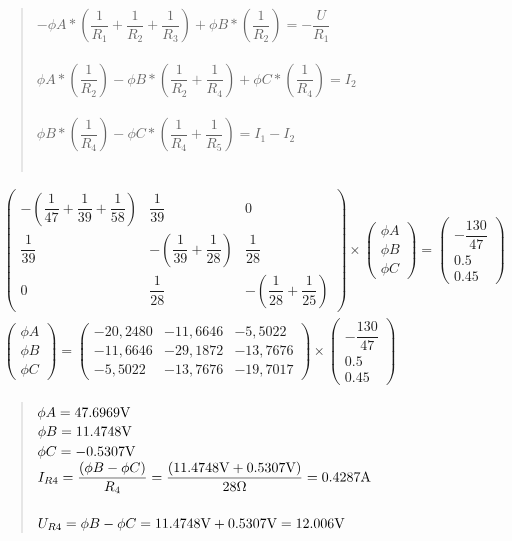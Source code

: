 \begin{quote}
    \medskip
    \medskip
    \centering
    $-\phi A * (\dfrac{1}{R_1} +  \dfrac{1}{R_2} + \dfrac{1}{R_3}) + \phi B * (\dfrac{ 1}{R_2} )  = -\dfrac{U}{R_1}$ \\~\\ 
    $\phi A * (\dfrac{1}{R_2}) - \phi B * (\dfrac{1}{R_2} + \dfrac{1}{R_4} ) + \phi C * (\dfrac{1}{R_4})  = I_2 $ \\~\\
    $\phi B * (\dfrac{1}{R_4}) - \phi C * (\dfrac{1}{R_4} + \dfrac{1}{R_5})  = I_1 - I_2 $ \\~\\
\end{quote}
\begin{align*}
	\begin{pmatrix}
		-(\dfrac{1}{47}+\dfrac{1}{39}+\dfrac{1}{58})&\dfrac{1}{39}&0\\
		\dfrac{1}{39}&-(\dfrac{1}{39}+\dfrac{1}{28})&\dfrac{1}{28}\\
		0&\dfrac{1}{28}&-(\dfrac{1}{28}+\dfrac{1}{25})
	\end{pmatrix}\times
	\begin{pmatrix}
		\phi A\\
		\phi B\\
		\phi C
	\end{pmatrix}=
	\begin{pmatrix}
		-\dfrac{130}{47}\\
		0.5 \\
		0.45
	\end{pmatrix} \\
	\begin{pmatrix}
		\phi A\\
		\phi B\\
		\phi C
	\end{pmatrix}=
	\begin{pmatrix}
		-20,2480& -11,6646& -5,5022\\
		-11,6646& -29,1872& -13,7676\\
		-5,5022& -13,7676& -19,7017
	\end{pmatrix}\times
	\begin{pmatrix}
		-\dfrac{130}{47}\\
		0.5 \\
		0.45
	\end{pmatrix}
\end{align*}

\begin{quote}
    \centering
    $\phi A = 47.6969 \Vo$ \\ 
    $\phi B = 11.4748 \Vo$ \\
    $\phi C = -0.5307 \Vo$ \\ 
    \medskip
    \medskip
    $I_{R4} = \dfrac{(\phi B - \phi C)}{R_4} = \dfrac{( 11.4748\Vo + 0.5307 \Vo)}{28\Omega} = 0.4287\Am$ \\~\\
    $U_{R4} = \phi B - \phi C = 11.4748 \Vo + 0.5307 \Vo = 12.006\Vo$
\end{quote}
 